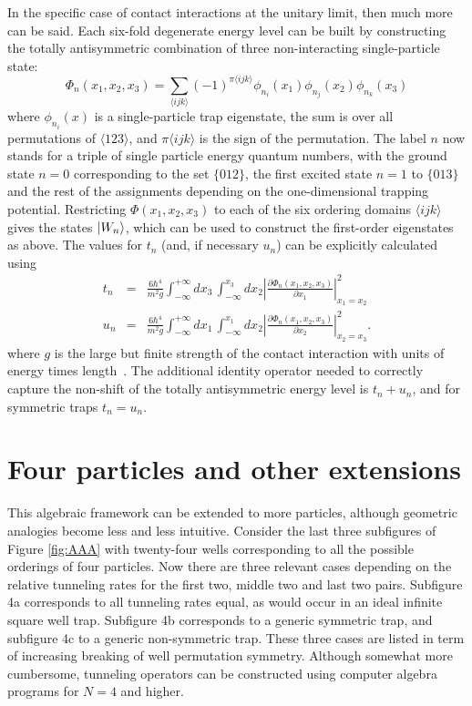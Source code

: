 In the specific case of contact interactions at the unitary limit, then much more can be said. Each six-fold degenerate energy level can be built by constructing the totally antisymmetric combination of three non-interacting single-particle state:
\begin{equation}
\Phi_n(x_1,x_2,x_3) = \sum_{\langle ijk \rangle} (-1)^{\pi\langle ijk \rangle} \phi_{n_i}(x_1)\phi_{n_j}(x_2)\phi_{n_k}(x_3)
\end{equation}
where $\phi_{n_i}(x)$ is a single-particle trap eigenstate, the sum is over all permutations of ${\langle 123 \rangle}$, and $\pi\langle ijk \rangle$ is the sign of the permutation. The label $n$ now stands for a triple of single particle energy quantum numbers, with the ground state $n=0$ corresponding to the set $\{012\}$, the first excited state $n=1$ to $\{013\}$ and the rest of the assignments depending on the one-dimensional trapping potential. Restricting $\Phi(x_1,x_2,x_3)$ to each of the six ordering domains $\langle ijk \rangle$ gives the states $|W_n\rangle$, which can be used to construct the first-order eigenstates as above. The values for $t_n$ (and, if necessary $u_n$) can be explicitly calculated using
\begin{eqnarray}
t_n &=& \frac{6 \hbar^4}{m^2 g} \int_{-\infty}^{+\infty} dx_3 \, \int_{-\infty}^{x_3} dx_2  \left|\frac{\partial \Phi_n(x_1,x_2,x_3)}{\partial x_1}\right|^2_{x_1=x_2}\nonumber\\
u_n &=& \frac{6 \hbar^4}{m^2 g} \int_{-\infty}^{+\infty} dx_1 \, \int_{-\infty}^{x_1} dx_2  \left|\frac{\partial \Phi_n(x_1,x_2,x_3)}{\partial x_2}\right|^2_{x_2=x_3}.
\end{eqnarray}
where $g$ is the large but finite strength of the contact interaction with units of energy times length~\cite{Deuretzbacher2014}. The additional identity operator needed to correctly capture the non-shift of the totally antisymmetric energy level is $t_n+u_n$, and for symmetric traps $t_n=u_n$.

\section{Four particles and other extensions}

This algebraic framework can be extended to more particles, although geometric analogies become less and less intuitive. Consider the last three subfigures of Figure \ref{fig:AAA} with twenty-four wells corresponding to all the possible orderings of four particles. Now there are three relevant cases depending on the relative tunneling rates for the first two, middle two and last two pairs. Subfigure 4a corresponds to all tunneling rates equal, as would occur in an ideal infinite square well trap. Subfigure 4b corresponds to a generic symmetric trap, and subfigure 4c to a generic non-symmetric trap. These three cases are listed in term of increasing breaking of well permutation symmetry. Although somewhat more cumbersome, tunneling operators can be constructed using computer algebra programs for $N=4$ and higher. 

